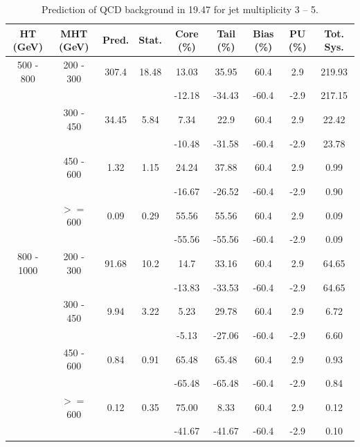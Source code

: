 \begin{table}[htbp]
 \caption{Prediction of QCD background in 19.47 \fbinv for jet multiplicity 3 -- 5.}
 \label{tab:qcd_rs_pred_njet3-5}
  \begin{center}
    \begin{tabular} {c|c|c|c|c|c|c|c|c}
    \hline
    HT (GeV) & MHT (GeV) & Pred. & Stat. & Core (\%) & Tail (\%) & Bias (\%) & PU (\%)& Tot. Sys. \\
    \hline
    500 - 800 & 200 - 300 & 307.4 & 18.48 & 13.03 & 35.95 & 60.4 & 2.9 & 219.93 \\ 
    & & & & -12.18 & -34.43 & -60.4 & -2.9 & 217.15 \\ 
    & 300 - 450 & 34.45 & 5.84 & 7.34 & 22.9 & 60.4 & 2.9 & 22.42 \\ 
    & & & & -10.48 & -31.58 & -60.4 & -2.9 & 23.78 \\ 
    & 450 - 600 & 1.32 & 1.15 & 24.24 & 37.88 & 60.4 & 2.9 & 0.99 \\ 
    & & & & -16.67 & -26.52 & -60.4 & -2.9 & 0.90 \\ 
    &  $>=$ 600 & 0.09 & 0.29 & 55.56 & 55.56 & 60.4 & 2.9 & 0.09 \\ 
    & & & & -55.56 & -55.56 & -60.4 & -2.9 & 0.09 \\ 
    \hline
    800 - 1000 & 200 - 300 & 91.68 & 10.2 & 14.7 & 33.16 & 60.4 & 2.9 & 64.65 \\ 
    & & & & -13.83 & -33.53 & -60.4 & -2.9 & 64.65 \\ 
    & 300 - 450 & 9.94 & 3.22 & 5.23 & 29.78 & 60.4 & 2.9 & 6.72 \\ 
    & & & & -5.13 & -27.06 & -60.4 & -2.9 & 6.60 \\ 
    & 450 - 600 & 0.84 & 0.91 & 65.48 & 65.48 & 60.4 & 2.9 & 0.93 \\ 
    & & & & -65.48 & -65.48 & -60.4 & -2.9 & 0.84 \\ 
    &  $>=$ 600 & 0.12 & 0.35 & 75.00 & 8.33 & 60.4 & 2.9 & 0.12 \\ 
    & & & & -41.67 & -41.67 & -60.4 & -2.9 & 0.10 \\ 
    \hline

\end{tabular}
\end{center}
\end{table}
